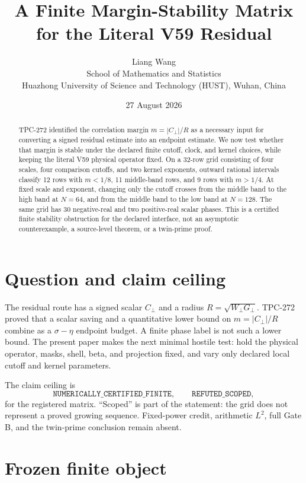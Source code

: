 \documentclass[11pt]{article}
\title{A Finite Margin-Stability Matrix for the Literal V59 Residual}
\author{Liang Wang\\
School of Mathematics and Statistics\\
Huazhong University of Science and Technology (HUST), Wuhan, China}
\date{27 August 2026}
\begin{document}
\maketitle

\begin{abstract}
TPC-272 identified the correlation margin \(m=|C_{\perp}|/R\) as a necessary
input for converting a signed residual estimate into an endpoint estimate.
We now test whether that margin is stable under the declared finite cutoff,
clock, and kernel choices, while keeping the literal V59 physical operator
fixed.  On a 32-row grid consisting of four scales, four comparison cutoffs,
and two kernel exponents, outward rational intervals classify 12 rows with
\(m<1/8\), 11 middle-band rows, and 9 rows with \(m>1/4\).  At fixed scale
and exponent, changing only the cutoff crosses from the middle band to the
high band at \(N=64\), and from the middle band to the low band at \(N=128\).
The same grid has 30 negative-real and two positive-real scalar phases.  This
is a certified finite stability obstruction for the declared interface, not
an asymptotic counterexample, a source-level theorem, or a twin-prime proof.
\end{abstract}

\section{Question and claim ceiling}

The residual route has a signed scalar \(C_{\perp}\) and a radius
\(R=\sqrt{W_{\perp}G_{\perp}}\).  TPC-272 proved that a scalar saving and a
quantitative lower bound on \(m=|C_{\perp}|/R\) combine as a
\(\sigma-\eta\) endpoint budget.  A finite phase label is not such a lower
bound.  The present paper makes the next minimal hostile test: hold the
physical operator, masks, shell, beta, and projection fixed, and vary only
declared local cutoff and kernel parameters.

The claim ceiling is
\[
 \texttt{NUMERICALLY\_CERTIFIED\_FINITE},\qquad
 \texttt{REFUTED\_SCOPED},
\]
for the registered matrix.  ``Scoped'' is part of the statement: the grid
does not represent a proved growing sequence.  Fixed-power credit,
arithmetic \(L^2\), full Gate B, and the twin-prime conclusion remain absent.

\section{Frozen finite object}
\end{document}

